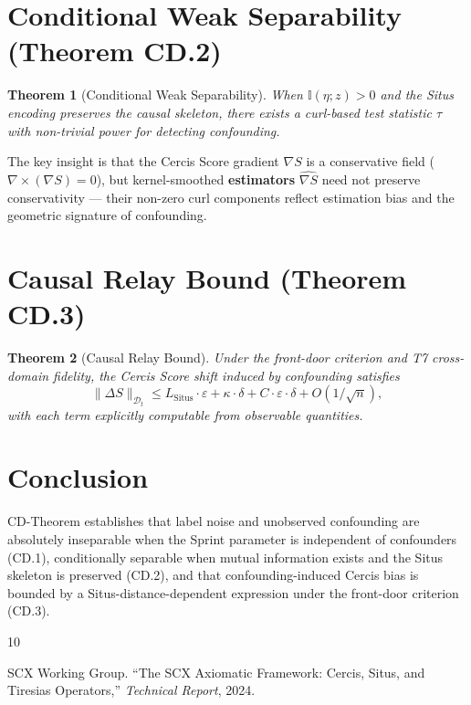 \documentclass[12pt,a4paper]{article}
\newtheorem{theorem}{Theorem}[section]
\newcommand{\I}{\mathbb{I}}
\newcommand{\cD}{\mathcal{D}}
\newcommand{\Situs}{\mathrm{Situs}}
\newcommand{\curl}{\nabla\! \times\!}
\newcommand{\grad}{\nabla}
\begin{document}
\section{Conditional Weak Separability (Theorem CD.2)}
\label{sec:weak}

\begin{theorem}[Conditional Weak Separability]\label{thm:weak-sep}
When $\I(\eta;z) > 0$ and the Situs encoding preserves the causal skeleton, there exists a curl-based test statistic $\tau$ with non-trivial power for detecting confounding.
\end{theorem}

The key insight is that the Cercis Score gradient $\grad S$ is a conservative field ($\curl(\grad S) = 0$), but kernel-smoothed \textbf{estimators} $\widehat{\grad S}$ need not preserve conservativity --- their non-zero curl components reflect estimation bias and the geometric signature of confounding.

\section{Causal Relay Bound (Theorem CD.3)}
\label{sec:relay}

\begin{theorem}[Causal Relay Bound]\label{thm:causal-relay}
Under the front-door criterion and T7 cross-domain fidelity, the Cercis Score shift induced by confounding satisfies
\[
\|\Delta S\|_{\cD_t} \leq L_{\Situs}\cdot\varepsilon + \kappa\cdot\delta + C\cdot\varepsilon\cdot\delta + O(1/\sqrt{n}),
\]
with each term explicitly computable from observable quantities.
\end{theorem}

\section{Conclusion}

CD-Theorem establishes that label noise and unobserved confounding are absolutely inseparable when the Sprint parameter is independent of confounders (CD.1), conditionally separable when mutual information exists and the Situs skeleton is preserved (CD.2), and that confounding-induced Cercis bias is bounded by a Situs-distance-dependent expression under the front-door criterion (CD.3).


\begin{thebibliography}{10}

SCX Working Group.
\newblock ``The \textsf{SCX} Axiomatic Framework: Cercis, Situs, and Tiresias Operators,''
\newblock \emph{Technical Report}, 2024.

\end{thebibliography}
\end{document}

